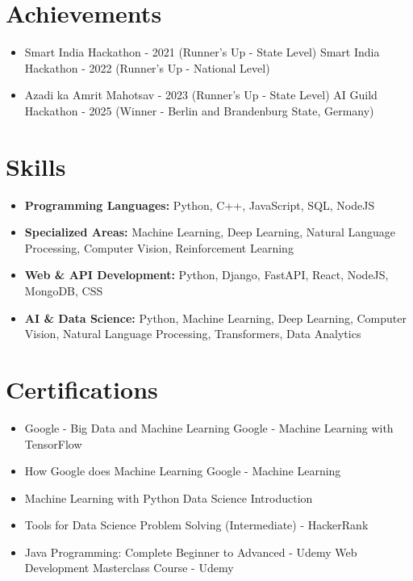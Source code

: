 \documentclass[a4paper,10pt]{article}
\begin{document}
\section*{Achievements}
\begin{itemize}
\item Smart India Hackathon - 2021 (Runner's Up - State Level) \hfill Smart India Hackathon - 2022 (Runner's Up - National Level)
\item Azadi ka Amrit Mahotsav - 2023 (Runner's Up - State Level) \hfill AI Guild Hackathon - 2025 (Winner - Berlin and Brandenburg State, Germany)
\end{itemize}

\section*{Skills}
\begin{itemize}
  \item \textbf{Programming Languages:} Python, C++, JavaScript, SQL, NodeJS
  \item \textbf{Specialized Areas:} Machine Learning, Deep Learning, Natural Language Processing, Computer Vision, Reinforcement Learning
  \item \textbf{Web \& API Development:} Python, Django, FastAPI, React, NodeJS, MongoDB, CSS
  \item \textbf{AI \& Data Science:} Python, Machine Learning, Deep Learning, Computer Vision, Natural Language Processing, Transformers, Data Analytics
\end{itemize}

\section*{Certifications}
\begin{itemize}
\item Google - Big Data and Machine Learning \hfill Google - Machine Learning with TensorFlow
\item How Google does Machine Learning \hfill Google - Machine Learning
\item Machine Learning with Python \hfill Data Science Introduction
\item Tools for Data Science \hfill Problem Solving (Intermediate) - HackerRank
\item Java Programming: Complete Beginner to Advanced - Udemy \hfill Web Development Masterclass Course - Udemy
\end{itemize}
\end{document}
